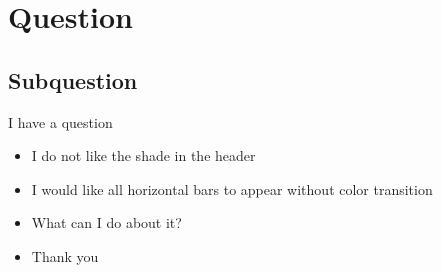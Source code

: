 \documentclass[xcolor=dvipsnames]{beamer}
\begin{document}
\section{Question}
\subsection{Subquestion}

\begin{frame}{I have a question}
\begin{itemize}
\item I do not like the shade in the header
\item I would like all horizontal bars to appear without color transition
\item What can I do about it?
\item Thank you
\end{itemize}
\end{frame}
\end{document}
